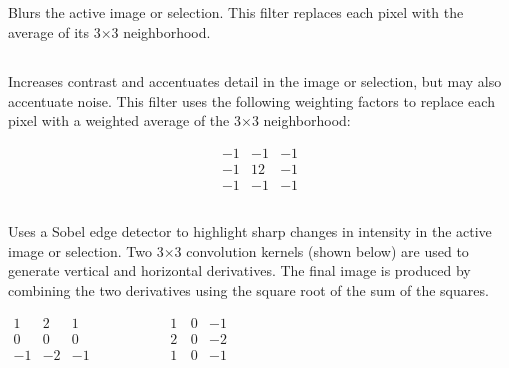 \subsection{{\small \protect{}\label{sub:Smooth-[S]}}}

Blurs the active image or selection. This filter replaces each pixel
with the average of its 3$\times$3 neighborhood.


\subsection{{\small \protect{}\label{sub:Sharpen}}}

Increases contrast and accentuates detail in the image
or selection, but may also accentuate noise. This filter
uses the following weighting factors to replace each pixel with a
weighted average of the 3$\times$3 neighborhood:{\small{} }{\small \par}

{\small 
\[
\begin{array}{rrr}
-1 & -1 & -1\\
-1 & 12 & -1\\
-1 & -1 & -1
\end{array}
\]
}{\small \par}


\subsection{{\small \protect{}\label{sub:Find-Edges}}}

Uses a Sobel edge detector to highlight sharp changes
in intensity in the active image or selection. Two 3$\times$3 convolution
kernels (shown below) are used to generate vertical and horizontal
derivatives. The final image is produced by combining the two derivatives
using the square root of the sum of the squares.

\noindent \begin{center}
{\small $\begin{array}{rrrrrrrrrrrr}
1 & 2 & 1 &  &  &  &  &  &  & \,1 & \,0 & -1\\
0 & 0 & 0 &  &  &  &  &  &  & \,2 & \,0 & -2\\
-1 & -2 & -1 &  &  &  &  &  &  & \,1 & \,0 & -1
\end{array}$}
\par\end{center}{\small \par}


